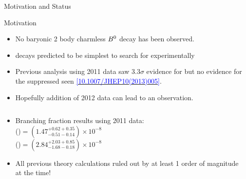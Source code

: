 \documentclass{beamer}
\begin{document}
\begin{frame}{ Motivation and Status}
  \begin{block}{Motivation}
    \begin{itemize}
    \item No baryonic 2 body charmless $B^{0}$ decay has been observed.
    \item {} decays predicted to be simplest to search for experimentally
    \end{itemize}
  \end{block}
  \begin{itemize}
  \item Previous analysis using 2011 data saw $3.3\sigma$ evidence for \decay{\Bd}{\proton\antiproton} but no evidence for the suppressed \decay{\Bs}{\proton\antiproton} seen \href{https://link.springer.com/article/10.1007\%2FJHEP10\%282013\%29005}{\textcolor{blue}{[10.1007/JHEP10(2013)005]}}.
  \item Hopefully addition of 2012 data can lead to an observation.
  \end{itemize}
  \begin{columns}
    \begin{column}{0.65\textwidth}
      \begin{itemize}
      \item Branching fraction results using 2011 data: \\
        \BF(\decay{\Bd}{\proton\antiproton})$ = (1.47^{+0.62+0.35}_{-0.51-0.14})\times 10^{-8}$\\
        \BF(\decay{\Bs}{\proton \antiproton})$ = (2.84^{+2.03 +0.85}_{-1.68 -0.18}) \times 10^{-8}$
      \item All previous theory calculations ruled out by at least 1 order of magnitude at the time!
      \end{itemize}
    \end{column}
    \begin{column}{0.34\textwidth}

\end{column}
\end{columns}
\end{frame}
\end{document}

